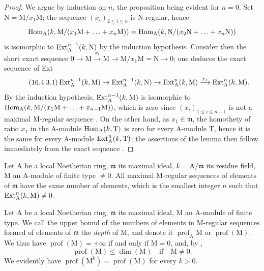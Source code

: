 \begin{proof}
We argue by induction on $n$, the proposition being evident for $n=0$.
Set $\mathrm{N}=\mathrm{M}/x_1\mathrm{M}$; the sequence $(x_i)_{2\leq i\leq n}$ is $\mathrm{N}$-regular, hence
\[
  \operatorname{Hom}_\mathrm{A}(k,\mathrm{M}/(x_1\mathrm{M}+\ldots+x_n\mathrm{M}))=\operatorname{Hom}_\mathrm{A}(k,\mathrm{N}/(x_2\mathrm{N}+\ldots+x_n\mathrm{N}))
\]
is isomorphic to $\operatorname{Ext}^{n-1}_\mathrm{A}(k,\mathrm{N})$ by the induction hypothesis.
Consider then the short exact sequence $0\to\mathrm{M}\xrightarrow{x_1}\mathrm{M}\to\mathrm{M}/x_1\mathrm{M}=\mathrm{N}\to 0$; one deduces the exact sequence of Ext
\begin{equation}
\label{0.16.4.3.1}
\tag{16.4.3.1}
  \operatorname{Ext}^{n-1}_\mathrm{A}(k,\mathrm{M})\to\operatorname{Ext}^{n-1}_\mathrm{A}(k,\mathrm{N})\to\operatorname{Ext}^n_\mathrm{A}(k,\mathrm{M})\xrightarrow{x_1}\operatorname{Ext}^n_\mathrm{A}(k,\mathrm{M}).
\end{equation}
By the induction hypothesis, $\operatorname{Ext}^{n-1}_\mathrm{A}(k,\mathrm{M})$ is isomorphic to $\operatorname{Hom}_\mathrm{A}(k,\mathrm{M}/(x_1\mathrm{M}+\ldots+x_{n-1}\mathrm{M}))$, which is zero since $(x_i)_{1\leq i\leq n-1}$ is not a maximal $\mathrm{M}$-regular sequence .
On the other hand, as $x_1\in\mathfrak{m}$, the homothety of ratio $x_1$ in the $\mathrm{A}$-module $\operatorname{Hom}_\mathrm{A}(k,\mathrm{T})$ is zero for every $\mathrm{A}$-module $\mathrm{T}$, hence it is the same for every $\mathrm{A}$-module $\operatorname{Ext}^n_\mathrm{A}(k,\mathrm{T})$; the assertions of the lemma then follow immediately from the exact sequence .
\end{proof}

\begin{corollary}[16.4.4]
\label{0.16.4.4}
Let $\mathrm{A}$ be a local Noetherian ring, $\mathfrak{m}$ its maximal ideal, $k=\mathrm{A}/\mathfrak{m}$ its residue field, $\mathrm{M}$ an $\mathrm{A}$-module of finite type $\neq 0$.
All maximal $\mathrm{M}$-regular sequences of elements of $\mathfrak{m}$ have the same number of elements, which is the smallest integer $n$ such that $\operatorname{Ext}^n_\mathrm{A}(k,\mathrm{M})\neq 0$.
\end{corollary}

\begin{definition}[16.4.5]
\label{0.16.4.5}
Let $\mathrm{A}$ be a local Noetherian ring, $\mathfrak{m}$ its maximal ideal, $\mathrm{M}$ an $\mathrm{A}$-module of finite type.
We call the upper bound of the numbers of elements in $\mathrm{M}$-regular sequences formed of elements of $\mathfrak{m}$ the \emph{depth} of $\mathrm{M}$, and denote it $\operatorname{prof}_\mathrm{A}\mathrm{M}$ or $\operatorname{prof}(\mathrm{M})$.
We thus have $\operatorname{prof}(\mathrm{M})=+\infty$ if and only if $\mathrm{M}=0$, and, by ,
\begin{equation}
\label{0.16.4.5.1}
\tag{16.4.5.1}
  \operatorname{prof}(\mathrm{M})\leq\dim(\mathrm{M})\quad\text{if}\quad\mathrm{M}\neq 0.
\end{equation}
We evidently have $\operatorname{prof}(\mathrm{M}^k)=\operatorname{prof}(\mathrm{M})$ for every $k>0$.
\end{definition}

